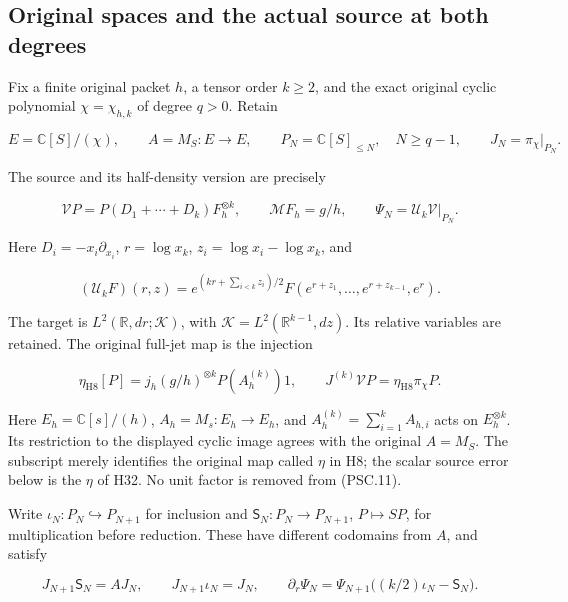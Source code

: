 
\subsection{Original spaces and the actual source at both degrees}

Fix a finite original packet \(h\), a tensor order \(k\geq2\), and the exact original cyclic polynomial \(\chi=\chi_{h,k}\) of degree \(q>0\). Retain

\[
 E=\mathbb C[S]/(\chi),\qquad A=M_S:E\longrightarrow E,
 \qquad P_N=\mathbb C[S]_{\leq N},\quad N\geq q-1,
 \qquad J_N=\pi_\chi|_{P_N}.
 \tag{PSC.9}
\]

The source and its half-density version are precisely

\[
 \mathcal VP=P(D_1+\cdots+D_k)F_h^{\otimes k},
 \qquad \mathcal MF_h=g/h,\qquad
 \Psi_N=\mathcal U_k\mathcal V|_{P_N}.
 \tag{PSC.10}
\]

Here \(D_i=-x_i\partial_{x_i}\),
\(r=\log x_k\), \(z_i=\log x_i-\log x_k\), and

\[
 (\mathcal U_kF)(r,z)
 =e^{(kr+\sum_{i<k}z_i)/2}
 F(e^{r+z_1},\ldots,e^{r+z_{k-1}},e^r).
\]

The target is \(L^2(\mathbb R,dr;\mathcal K)\), with
\(\mathcal K=L^2(\mathbb R^{k-1},dz)\). Its relative variables are retained. The original full-jet map is the injection

\[
 \eta_{\mathrm{H8}}[P]
 =j_h(g/h)^{\otimes k}P(A_h^{(k)})1,\qquad
 J^{(k)}\mathcal VP=\eta_{\mathrm{H8}}\pi_\chi P.
 \tag{PSC.11}
\]

Here \(E_h=\mathbb C[s]/(h)\), \(A_h=M_s:E_h\to E_h\), and \(A_h^{(k)}=\sum_{i=1}^kA_{h,i}\) acts on \(E_h^{\otimes k}\). Its restriction to the displayed cyclic image agrees with the original \(A=M_S\). The subscript merely identifies the original map called \(\eta\) in H8; the scalar source error below is the \(\eta\) of H32. No unit factor is removed from (PSC.11).

Write \(\iota_N:P_N\hookrightarrow P_{N+1}\) for inclusion and
\(\mathsf S_N:P_N\to P_{N+1}\), \(P\mapsto SP\), for multiplication before reduction. These have different codomains from \(A\), and satisfy

\[
 J_{N+1}\mathsf S_N=AJ_N,\qquad
 J_{N+1}\iota_N=J_N,\qquad
 \partial_r\Psi_N
 =\Psi_{N+1}\bigl((k/2)\iota_N-\mathsf S_N\bigr).
 \tag{PSC.12}
\]

